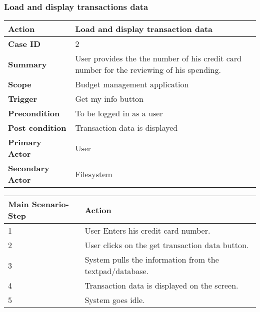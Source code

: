 \documentclass[letterpaper]{article}
\begin{document}
		\subsubsection{Load and display transactions data}
		
		\begin{center}
	        \begin{tabular}{ | m{5cm} | m{10cm}| } 
	            \hline
	            \textbf{Action} & Load and display transaction data \\ 
	            \hline
	            \textbf{Case ID} & 2 \\ 
	            \hline
	            \textbf{Summary} & User provides the the number of his credit card number for the reviewing of his spending. \\
	            \hline
	            \textbf{Scope} & Budget management application \\ 
	            \hline
	            \textbf{Trigger} & Get my info button \\
	            \hline
	            \textbf{Precondition} & To be logged in as a user \\ 
	            \hline
	            \textbf{Post condition} & Transaction data is displayed \\ 
	            \hline
	            \textbf{Primary Actor} & User \\ 
	            \hline
	            \textbf{Secondary Actor} & Filesystem \\ 
	            \hline
	        \end{tabular}
        
        	\vspace{2mm}
        
           	\begin{tabular}{ | m{5cm} | m{10cm}| } 
           		\hline
	            \textbf{Main Scenario-Step} & \textbf{Action} \\ 
	            \hline
	            1 & User Enters his credit card number. \\ 
	            \hline
	            2 & User clicks on the get transaction data button. \\ 
	            \hline
	            3 & System pulls the information from the textpad/database. \\ 
	            \hline
	            4 & Transaction data is displayed on the screen. \\ 
	            \hline
	            5 & System goes idle. \\ 
	            \hline
	        \end{tabular}
        \end{center}
        
\end{document}
